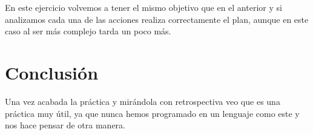 \documentclass[a4paper,11pt]{article}
\begin{document}
En este ejercicio volvemos a tener el mismo objetivo que en el anterior y si analizamos cada una de las acciones realiza correctamente el plan, aunque en este caso al ser más complejo tarda un poco más. 

\section{Conclusión}
Una vez acabada la práctica y mirándola con retrospectiva veo que es una práctica muy útil, ya que nunca hemos programado en un lenguaje como este y nos hace pensar de otra manera.
\end{document}
